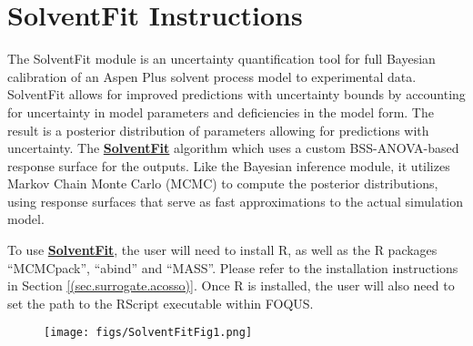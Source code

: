 \documentclass[12pt]{article}
\begin{document}
\label{sec:solvent_fit}

\section{SolventFit Instructions}
The SolventFit module is an uncertainty quantification tool for full Bayesian calibration of an Aspen
Plus solvent process model to experimental data. SolventFit
allows for improved predictions with uncertainty bounds by accounting for uncertainty in model parameters
and deficiencies in the model form. The result is a posterior
distribution of parameters allowing for predictions with uncertainty.
The \textbf{\underline{SolventFit}}
algorithm %
which uses a custom BSS-ANOVA-based response
surface for the outputs. Like the Bayesian inference module, it utilizes Markov Chain Monte Carlo
(MCMC) to compute the posterior distributions, using response surfaces
that serve as fast approximations to the actual simulation model.

To use \textbf{\underline{SolventFit}}, the user will need to install R, as well as the R
packages ``MCMCpack'', ``abind'' and ``MASS''. Please refer to the
installation instructions in Section \ref{(sec.surrogate.acosso)}. 
Once R is installed, the user will also need to set the path to the RScript
executable within FOQUS. 


\begin{figure}[h!]
\centering \texttt{[image: figs/SolventFitFig1.png]}
\label{fig:SolventFit_Fig_1}
\end{figure}
\end{document}

